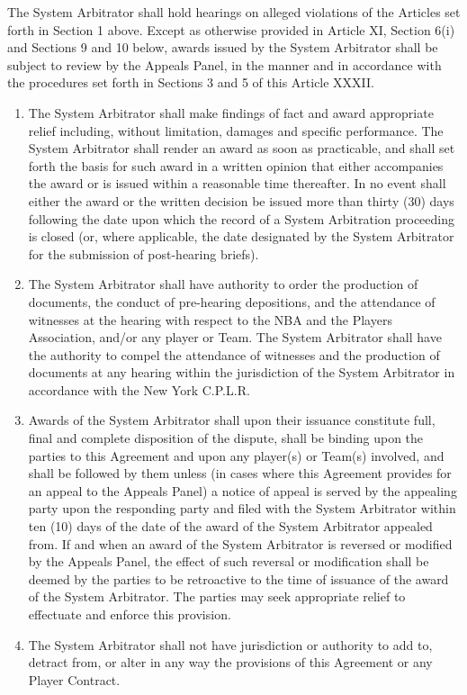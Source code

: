 \documentclass[
]{book}
\providecommand{\tightlist}{%
  \setlength{\itemsep}{0pt}\setlength{\parskip}{0pt}}
\begin{document}
The System Arbitrator shall hold hearings on alleged violations of the Articles set forth in Section 1 above. Except as otherwise provided in Article XI, Section 6(i) and Sections 9 and 10 below, awards issued by the System Arbitrator shall be subject to review by the Appeals Panel, in the manner and in accordance with the procedures set forth in Sections 3 and 5 of this Article XXXII.

\begin{enumerate}
\def\labelenumi{(\alph{enumi})}
\tightlist
\item
  The System Arbitrator shall make findings of fact and award appropriate relief including, without limitation, damages and specific performance. The System Arbitrator shall render an award as soon as practicable, and shall set forth the basis for such award in a written opinion that either accompanies the award or is issued within a reasonable time thereafter. In no event shall either the award or the written decision be issued more than thirty (30) days following the date upon which the record of a System Arbitration proceeding is closed (or, where applicable, the date designated by the System Arbitrator for the submission of post-hearing briefs).
\item
  The System Arbitrator shall have authority to order the production of documents, the conduct of pre-hearing depositions, and the attendance of witnesses at the hearing with respect to the NBA and the Players Association, and/or any player or Team. The System Arbitrator shall have the authority to compel the attendance of witnesses and the production of documents at any hearing within the jurisdiction of the System Arbitrator in accordance with the New York C.P.L.R.
\item
  Awards of the System Arbitrator shall upon their issuance constitute full, final and complete disposition of the dispute, shall be binding upon the parties to this Agreement and upon any player(s) or Team(s) involved, and shall be followed by them unless (in cases where this Agreement provides for an appeal to the Appeals Panel) a notice of appeal is served by the appealing party upon the responding party and filed with the System Arbitrator within ten (10) days of the date of the award of the System Arbitrator appealed from. If and when an award of the System Arbitrator is reversed or modified by the Appeals Panel, the effect of such reversal or modification shall be deemed by the parties to be retroactive to the time of issuance of the award of the System Arbitrator. The parties may seek appropriate relief to effectuate and enforce this provision.
\item
  The System Arbitrator shall not have jurisdiction or authority to add to, detract from, or alter in any way the provisions of this Agreement or any Player Contract.
\end{enumerate}
\end{document}
